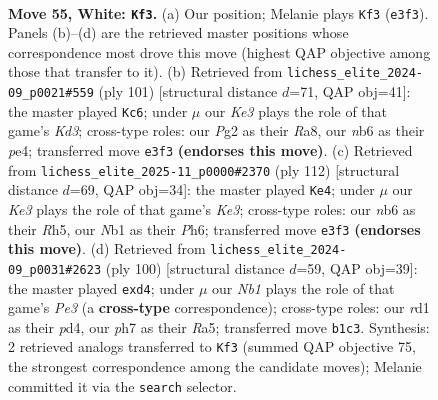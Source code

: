 \documentclass[11pt]{article}
\begin{document}
\clearpage

\begin{figure}[p]\centering
\begin{subfigure}{0.46\textwidth}\centering
\resizebox{\linewidth}{!}{%
\newchessgame
\chessboard[
  setfen={7k/5p1p/1n4p1/p3p1P1/P3P3/1P2K1RP/6P1/RN1r3r w - - 24 55},
  showmover=false,
  pgfstyle=straightmove, color=movearrow, markmove={e3-f3}
]}
\caption{}
\end{subfigure}\hfill
\begin{subfigure}{0.46\textwidth}\centering
\resizebox{\linewidth}{!}{%
\newchessgame
\chessboard[
  setfen={r7/5pp1/r2kp2p/3p4/3PPP2/p4K2/R7/R7 b - - 0 51},
  showmover=false,
  pgfstyle=straightmove, color=movearrow, markmove={d6-c6}
]}
\caption{}
\end{subfigure}
\\[4pt]
\begin{subfigure}{0.46\textwidth}\centering
\resizebox{\linewidth}{!}{%
\newchessgame
\chessboard[
  setfen={8/2p4r/1p2kr1P/p1p1p2R/P6R/1P1PK3/2P5/8 w - - 27 57},
  showmover=false,
  pgfstyle=straightmove, color=movearrow, markmove={e3-e4}
]}
\caption{}
\end{subfigure}\hfill
\begin{subfigure}{0.46\textwidth}\centering
\resizebox{\linewidth}{!}{%
\newchessgame
\chessboard[
  setfen={1k6/1r6/1P2r1p1/R1P2p1p/P2p1P2/1R2P1PK/8/8 w - - 0 51},
  showmover=false,
  pgfstyle=straightmove, color=movearrow, markmove={e3-d4}
]}
\caption{}
\end{subfigure}
\caption{\textbf{Move 55, White: \texttt{Kf3}.} (a) Our position; Melanie plays \texttt{Kf3} (\texttt{e3f3}). Panels (b)--(d) are the retrieved master positions whose correspondence most drove this move (highest QAP objective among those that transfer to it). (b) Retrieved from \texttt{lichess\_elite\_2024-09\_p0021\#559} (ply 101) [structural distance $d$=71, QAP obj=41]: the master played \texttt{Kc6}; under $\mu$ our \emph{Ke3} plays the role of that game's \emph{Kd3}; cross-type roles: our \emph{P}g2 as their \emph{R}a8, our \emph{n}b6 as their \emph{p}e4; transferred move \texttt{e3f3} \textbf{(endorses this move)}. (c) Retrieved from \texttt{lichess\_elite\_2025-11\_p0000\#2370} (ply 112) [structural distance $d$=69, QAP obj=34]: the master played \texttt{Ke4}; under $\mu$ our \emph{Ke3} plays the role of that game's \emph{Ke3}; cross-type roles: our \emph{n}b6 as their \emph{R}h5, our \emph{N}b1 as their \emph{P}h6; transferred move \texttt{e3f3} \textbf{(endorses this move)}. (d) Retrieved from \texttt{lichess\_elite\_2024-09\_p0031\#2623} (ply 100) [structural distance $d$=59, QAP obj=39]: the master played \texttt{exd4}; under $\mu$ our \emph{Nb1} plays the role of that game's \emph{Pe3} (a \textbf{cross-type} correspondence); cross-type roles: our \emph{r}d1 as their \emph{p}d4, our \emph{p}h7 as their \emph{R}a5; transferred move \texttt{b1c3}. Synthesis: 2 retrieved analogs transferred to \texttt{Kf3} (summed QAP objective 75, the strongest correspondence among the candidate moves); Melanie committed it via the \texttt{search} selector.}
\label{fig:thought-m108}
\end{figure}
\end{document}
